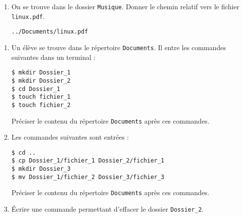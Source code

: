 \documentclass[a4paper,dvipsnames]{article}
\newenvironment{correction}{\color{blue}}{}
\begin{document}
\begin{exercice}{}{}
\begin{enumerate}
    \item On se trouve dans le dossier \texttt{Musique}. Donner le chemin relatif vers le fichier \texttt{linux.pdf}.

      \begin{correction}
	\begin{center}
	  \texttt{../Documents/linux.pdf}
	\end{center}
      \end{correction}
      
  \end{enumerate}
\end{exercice}

\smallskip

\begin{exercice}[breakable]{}{}
  
  \begin{enumerate}
    \item Un élève se trouve dans le répertoire \texttt{Documents}. Il entre les commandes suivantes dans un terminal :

      \begin{verbatim}
$ mkdir Dossier_1
$ mkdir Dossier_2
$ cd Dossier_1
$ touch fichier_1
$ touch fichier_2
      \end{verbatim}

      Préciser le contenu du répertoire \texttt{Documents} après ces commandes.

      \begin{correction}
	\begin{minipage}{2cm}
	\end{minipage}
      \end{correction}


    \item Les commandes suivantes sont entrées :

      \begin{verbatim}
$ cd ..
$ cp Dossier_1/fichier_1 Dossier_2/fichier_1
$ mkdir Dossier_3
$ mv Dossier_1/fichier_2 Dossier_3/fichier_3
      \end{verbatim}

      Préciser le contenu du répertoire \texttt{Documents} après ces commandes.

      \begin{correction}
	\begin{minipage}{2cm}
	\end{minipage}
      \end{correction}
    \item Écrire une commande permettant d'effacer le dossier \texttt{Dossier_2}.


\end{enumerate}
\end{exercice}
\end{document}
